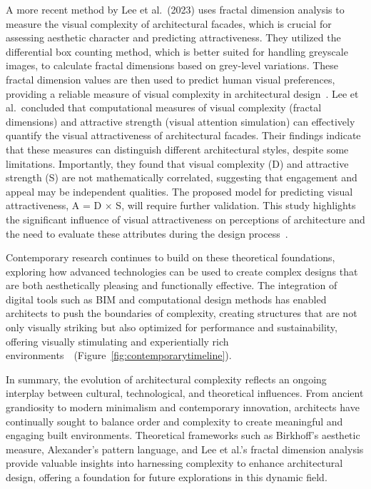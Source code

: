 A more recent method by Lee et al.~(2023) uses fractal dimension analysis to measure the visual complexity of architectural facades, which is crucial for assessing aesthetic character and predicting attractiveness.
They utilized the differential box counting method, which is better suited for handling greyscale images, to calculate fractal dimensions based on grey-level variations.
These fractal dimension values are then used to predict human visual preferences, providing a reliable measure of visual complexity in architectural design~\cite{Lee2023}.
Lee et al.~concluded that computational measures of visual complexity (fractal dimensions) and attractive strength (visual attention simulation) can effectively quantify the visual attractiveness of architectural facades.
Their findings indicate that these measures can distinguish different architectural styles, despite some limitations.
Importantly, they found that visual complexity (D) and attractive strength (S) are not mathematically correlated, suggesting that engagement and appeal may be independent qualities.
The proposed model for predicting visual attractiveness, A = D × S, will require further validation.
This study highlights the significant influence of visual attractiveness on perceptions of architecture and the need to evaluate these attributes during the design process~\cite{Lee2023}.

Contemporary research continues to build on these theoretical foundations, exploring how advanced technologies can be used to create complex designs that are both aesthetically pleasing and functionally effective.
The integration of digital tools such as BIM and computational design methods has enabled architects to push the boundaries of complexity, creating structures that are not only visually striking but also optimized for performance and sustainability, offering visually stimulating and experientially rich environments~\cite{Gage2015}~(Figure~\ref{fig:contemporarytimeline}).

In summary, the evolution of architectural complexity reflects an ongoing interplay between cultural, technological, and theoretical influences.
From ancient grandiosity to modern minimalism and contemporary innovation, architects have continually sought to balance order and complexity to create meaningful and engaging built environments.
Theoretical frameworks such as Birkhoff's aesthetic measure, Alexander's pattern language, and Lee et al.'s fractal dimension analysis provide valuable insights into harnessing complexity to enhance architectural design, offering a foundation for future explorations in this dynamic field.

